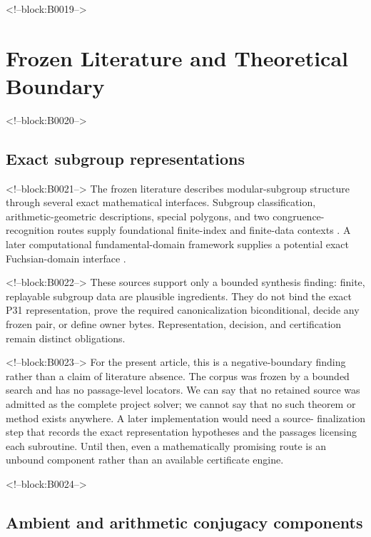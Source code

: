 \documentclass[11pt]{article}
\begin{document}
<!--block:B0019-->
\hypertarget{2-frozen-literature-and-theoretical-boundary}{%
\section{Frozen Literature and Theoretical
Boundary}\label{2-frozen-literature-and-theoretical-boundary}}

<!--block:B0020-->
\hypertarget{21-exact-subgroup-representations}{%
\subsection{Exact subgroup
representations}\label{21-exact-subgroup-representations}}

<!--block:B0021-->
The frozen literature describes modular-subgroup structure through
several exact mathematical interfaces.
Subgroup classification, arithmetic-geometric descriptions, special
polygons, and two congruence-recognition routes supply foundational
finite-index and finite-data contexts
\citep{P31-S01,P31-S02,P31-S03,P31-S04,P31-S05}.
A later computational fundamental-domain framework supplies a potential
exact Fuchsian-domain interface
\citep{P31-S06}.

<!--block:B0022-->
These sources support only a bounded synthesis finding: finite,
replayable subgroup data are plausible ingredients. They do not bind the
exact P31 representation, prove the required canonicalization
biconditional, decide any frozen pair, or define owner bytes.
Representation, decision, and certification remain distinct obligations.

<!--block:B0023-->
For the present article, this is a negative-boundary finding rather than a claim of
literature absence. The corpus was frozen by a bounded search and has no
passage-level locators. We can say that no retained source was admitted
as the complete project solver; we cannot say that no such theorem or
method exists anywhere. A later implementation would need a source-
finalization step that records the exact representation hypotheses and
the passages licensing each subroutine. Until then, even a mathematically
promising route is an unbound component rather than an available
certificate engine.

<!--block:B0024-->
\hypertarget{22-ambient-and-arithmetic-conjugacy-components}{%
\subsection{Ambient and arithmetic conjugacy
components}\label{22-ambient-and-arithmetic-conjugacy-components}}
\end{document}
